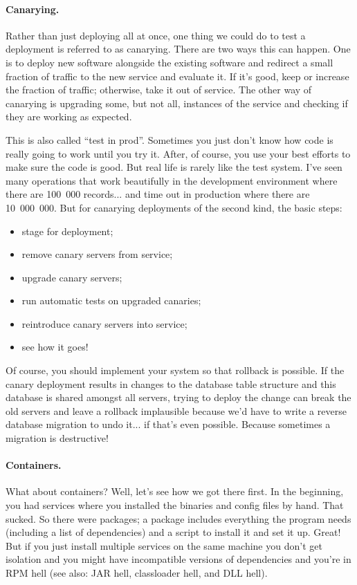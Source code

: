 \paragraph{Canarying.} Rather than just deploying all at once, one thing we could do to test a deployment is referred to as canarying. There are two ways this can happen. One is to deploy new software alongside the existing software and redirect a small fraction of traffic  to the new service and evaluate it. If it's good, keep or increase the fraction of traffic; otherwise, take it out of service. The other way of canarying is upgrading some, but not all, instances of the service and checking if they are working as expected.

This is also called ``test in prod''. Sometimes you just don't know how code is really going to work until you try it. After, of course, you use your best
efforts to make sure the code is good. But real life is rarely like the test system. I've seen many operations that work beautifully in the development environment where there are 100~000 records... and time out in production where there are 10~000~000. But for canarying deployments of the second kind, the basic steps:
\begin{itemize}[noitemsep]
\item stage for deployment;
\item remove canary servers from service;
\item upgrade canary servers;
\item run automatic tests on upgraded canaries;
\item reintroduce canary servers into service;
\item see how it goes!
\end{itemize}

Of course, you should implement your system so that rollback is possible. If the canary deployment results in changes to the database table structure and this database is shared amongst all servers, trying to deploy the change can break the old servers and leave a rollback implausible because we'd have to write a reverse database migration to undo it... if that's even possible. Because sometimes a migration is destructive!



\paragraph{Containers.} What about containers? Well, let's see how we got there first. In the beginning, you had services where you installed the binaries and config files by hand. That sucked. So there were packages; a package includes everything the program needs (including a list of dependencies) and a script to install it and set it up. Great! But if you just install multiple services on the same machine you don't get isolation and you might have incompatible versions of dependencies and you're in RPM hell (see also: JAR hell, classloader hell, and DLL hell).

